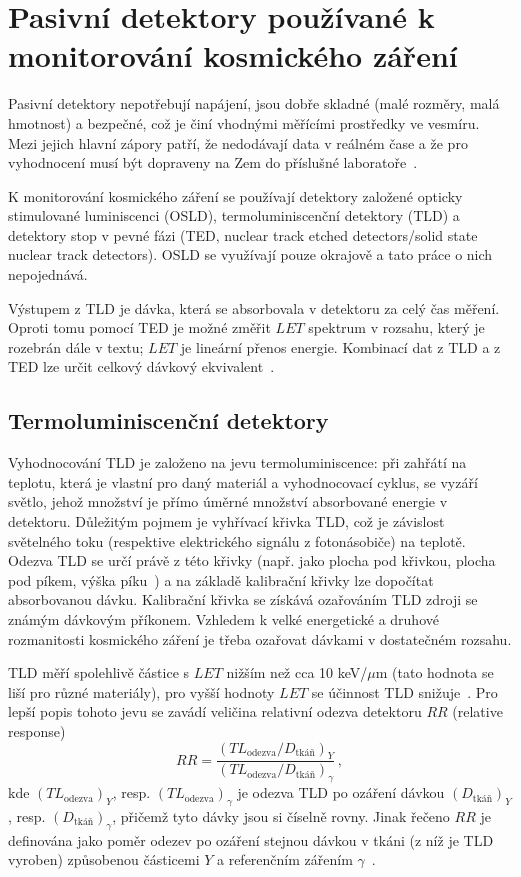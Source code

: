 \chapter{Pasivní detektory používané k monitorování kosmického záření}\label{sec:detektory_detektory}
Pasivní detektory nepotřebují napájení, jsou dobře skladné (malé rozměry, malá hmotnost) a bezpečné, což je činí vhodnými měřícími prostředky ve vesmíru. Mezi jejich hlavní zápory patří, že nedodávají data v reálném čase a že pro vyhodnocení musí být dopraveny na Zem do příslušné laboratoře~\cite{benton}.

K monitorování kosmického záření se používají detektory založené opticky stimulované luminiscenci (OSLD), termoluminiscenční detektory (TLD) a detektory stop v pevné fázi (TED, nuclear track etched detectors/solid state nuclear track detectors). OSLD se využívají pouze okrajově a tato práce o nich nepojednává.

Výstupem z TLD je dávka, která se absorbovala v detektoru za celý čas měření. Oproti tomu pomocí TED je možné změřit $\mathit{LET}$ spektrum v rozsahu, který je rozebrán dále v textu; $\mathit{LET}$ je lineární přenos energie. Kombinací dat z TLD a z TED lze určit celkový dávkový ekvivalent~\cite{benton}.
\section{Termoluminiscenční detektory}\label{sec:detektory_TLD}
Vyhodnocování TLD je založeno na jevu termoluminiscence: při zahřátí na teplotu, která je vlastní pro daný materiál a vyhodnocovací cyklus, se vyzáří světlo, jehož množství je přímo úměrné množství absorbované energie v detektoru. Důležitým pojmem je vyhřívací křivka TLD, což je závislost světelného toku (respektive elektrického signálu z fotonásobiče) na teplotě. Odezva TLD se určí právě z této křivky (např. jako plocha pod křivkou, plocha pod píkem, výška píku~\cite{dosis}) a na základě kalibrační křivky lze dopočítat absorbovanou dávku. Kalibrační křivka se získává ozařováním TLD zdroji se známým dávkovým příkonem. Vzhledem k velké energetické a druhové rozmanitosti kosmického záření je třeba ozařovat dávkami v dostatečném rozsahu. 

TLD měří spolehlivě částice s $\mathit{LET}$ nižším než cca 10 keV/$\mu$m (tato hodnota se liší pro různé materiály), pro vyšší hodnoty $\mathit{LET}$ se účinnost TLD snižuje~\cite{passDetectors}. Pro lepší popis tohoto jevu se zavádí veličina relativní odezva detektoru $\mathit{RR}$ (relative response)
\begin{equation}
  \mathit{RR}=\frac{\left(TL_{\text{odezva}}/D_{\text{tkáň}}\right)_Y}{\left(TL_{\text{odezva}}/D_{\text{tkáň}}\right)_{\gamma}}\,,
  \label{eq:detektory_TLD_RR}
\end{equation}
kde $(TL_{\text{odezva}})_Y$, resp. $(TL_{\text{odezva}})_{\gamma}$ je odezva TLD po ozáření dávkou $(D_{\text{tkáň}})_Y$, resp. $(D_{\text{tkáň}})_{\gamma}$, přičemž tyto dávky jsou si číselně rovny. Jinak řečeno $\mathit{RR}$ je definována jako poměr odezev po ozáření stejnou dávkou v tkáni (z níž je TLD vyroben) způsobenou částicemi $Y$ a referenčním zářením $\gamma$~\cite{TLD_RR}. 

